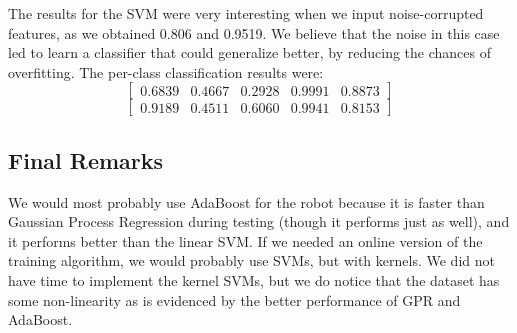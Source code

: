 \documentclass[letterpaper]{article}
\begin{document}
The results for the SVM were very interesting when we input
noise-corrupted features, as we obtained 0.806 and 0.9519. We believe
that the noise in this case led to learn a classifier that could
generalize better, by reducing the chances of overfitting. The
per-class classification results were:
$$\begin{bmatrix} 0.6839  &  0.4667  &  0.2928  &  0.9991  &  0.8873\end{bmatrix}$$
$$\begin{bmatrix} 0.9189   & 0.4511   & 0.6060    & 0.9941   & 0.8153\end{bmatrix}$$

\subsection*{Final Remarks}

We would most probably use AdaBoost for the robot because it is faster
than Gaussian Process Regression during testing (though it performs
just as well), and it performs better than the linear SVM. If we
needed an online version of the training algorithm, we would probably
use SVMs, but with kernels. We did not have time to implement the
kernel SVMs, but we do notice that the dataset has some non-linearity
as is evidenced by the better performance of GPR and AdaBoost.
\end{document}
